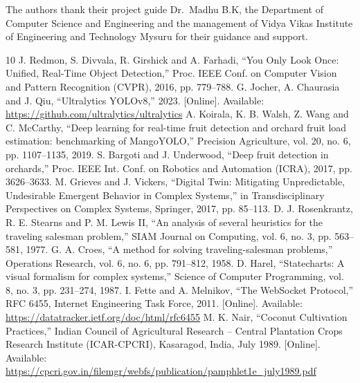 \documentclass[10pt,a4paper]{article}
\newcommand{\irjsec}[1]{\par\vspace{6pt}\noindent{\cambria\bfseries\fontsize{12}{14}\selectfont\textbullet~#1}\par\vspace{3pt}}
\begin{document}
\irjsec{ACKNOWLEDGEMENTS}
The authors thank their project guide Dr.~Madhu B.K, the Department of Computer Science and Engineering and the management of Vidya Vikas Institute of Engineering and Technology Mysuru for their guidance and support.

\irjsec{REFERENCES}
\begin{thebibliography}{10}
\setlength{\itemsep}{1pt}
 J. Redmon, S. Divvala, R. Girshick and A. Farhadi, ``You Only Look Once: Unified, Real-Time Object Detection,'' Proc. IEEE Conf. on Computer Vision and Pattern Recognition (CVPR), 2016, pp. 779--788.
 G. Jocher, A. Chaurasia and J. Qiu, ``Ultralytics YOLOv8,'' 2023. [Online]. Available: \url{https://github.com/ultralytics/ultralytics}
 A. Koirala, K. B. Walsh, Z. Wang and C. McCarthy, ``Deep learning for real-time fruit detection and orchard fruit load estimation: benchmarking of MangoYOLO,'' Precision Agriculture, vol. 20, no. 6, pp. 1107--1135, 2019.
 S. Bargoti and J. Underwood, ``Deep fruit detection in orchards,'' Proc. IEEE Int. Conf. on Robotics and Automation (ICRA), 2017, pp. 3626--3633.
 M. Grieves and J. Vickers, ``Digital Twin: Mitigating Unpredictable, Undesirable Emergent Behavior in Complex Systems,'' in Transdisciplinary Perspectives on Complex Systems, Springer, 2017, pp. 85--113.
 D. J. Rosenkrantz, R. E. Stearns and P. M. Lewis II, ``An analysis of several heuristics for the traveling salesman problem,'' SIAM Journal on Computing, vol. 6, no. 3, pp. 563--581, 1977.
 G. A. Croes, ``A method for solving traveling-salesman problems,'' Operations Research, vol. 6, no. 6, pp. 791--812, 1958.
 D. Harel, ``Statecharts: A visual formalism for complex systems,'' Science of Computer Programming, vol. 8, no. 3, pp. 231--274, 1987.
 I. Fette and A. Melnikov, ``The WebSocket Protocol,'' RFC 6455, Internet Engineering Task Force, 2011. [Online]. Available: \url{https://datatracker.ietf.org/doc/html/rfc6455}
 M. K. Nair, ``Coconut Cultivation Practices,'' Indian Council of Agricultural Research -- Central Plantation Crops Research Institute (ICAR-CPCRI), Kasaragod, India, July 1989. [Online]. Available: \url{https://cpcri.gov.in/filemgr/webfs/publication/pamphlet1e_july1989.pdf}
\end{thebibliography}
\end{document}
